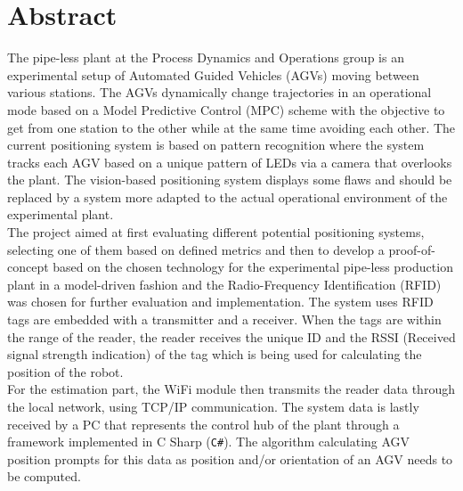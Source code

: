 \section*{Abstract} %

The pipe-less plant at the Process Dynamics and Operations group is an experimental setup of Automated Guided Vehicles (AGVs) moving between various stations. The AGVs dynamically change trajectories in an operational mode based on a Model Predictive Control (MPC) scheme with the objective to get from one station to the other while at the same time avoiding each other. The current positioning system is based on pattern recognition where the system tracks each AGV based on a unique pattern of LEDs via a camera that overlooks the plant. The vision-based positioning system displays some flaws and should be replaced by a system more adapted to the actual operational environment of the experimental plant. \\

The project aimed at first evaluating different potential positioning systems, selecting one of them based on defined metrics and then to develop a proof-of-concept based on the chosen technology for the experimental pipe-less production plant in a model-driven fashion and the 
Radio-Frequency Identification (RFID) was chosen for further evaluation and implementation.
The system uses RFID tags are embedded with a transmitter and a receiver. When the tags are within the range of the reader, the reader receives the unique ID and the RSSI (Received signal strength indication) of the tag which is being used for calculating the position of the robot. \\

For the estimation part, the WiFi module then transmits the reader data through the local network, using TCP/IP communication. The system data is lastly received by a PC that represents the control hub of the plant through a framework implemented in C Sharp (\texttt{C\#}). The algorithm calculating AGV position prompts for this data as position and/or orientation of an AGV needs to be computed.

